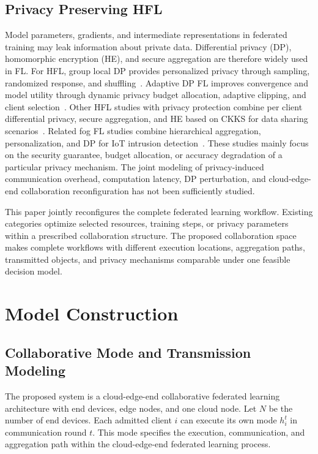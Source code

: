 \documentclass[5p,times]{elsarticle}
\theoremstyle{plain}
\theoremstyle{definition}
\theoremstyle{remark}
\begin{document}
\subsection{Privacy Preserving HFL}
Model parameters, gradients, and intermediate representations in federated
training may leak information about private data.
Differential privacy (DP), homomorphic encryption (HE), and secure aggregation
are therefore widely used in FL.
For HFL, group local DP provides personalized privacy through sampling,
randomized response, and shuffling~\cite{GLDP}.
Adaptive DP FL improves convergence and model utility through dynamic privacy
budget allocation, adaptive clipping, and client selection~\cite{xu2025adpfl}.
Other HFL studies with privacy protection combine per client differential
privacy, secure aggregation, and HE based on CKKS for data sharing
scenarios~\cite{PPHFL}.
Related fog FL studies combine hierarchical aggregation, personalization, and DP
for IoT intrusion detection~\cite{islam2025pphffl}.
These studies mainly focus on the security guarantee, budget allocation, or
accuracy degradation of a particular privacy mechanism.
The joint modeling of privacy-induced communication overhead, computation
latency, DP perturbation, and cloud-edge-end collaboration reconfiguration
has not been sufficiently studied.

This paper jointly reconfigures the complete federated learning workflow.
Existing categories optimize selected resources, training steps, or privacy
parameters within a prescribed collaboration structure. The proposed
collaboration space makes complete workflows with different execution
locations, aggregation paths, transmitted objects, and privacy mechanisms
comparable under one feasible decision model.
\section{Model Construction}
\label{sec:model}
\subsection{Collaborative Mode and Transmission Modeling}
\label{sec:link_model}

The proposed system is a cloud-edge-end collaborative federated learning architecture with end devices, edge nodes, and one cloud node. Let \(N\) be the number of end devices. Each admitted client \(i\) can execute its own mode \(h_i^t\) in communication round \(t\). This mode specifies the execution, communication, and aggregation path within the cloud-edge-end federated learning process.
\end{document}
